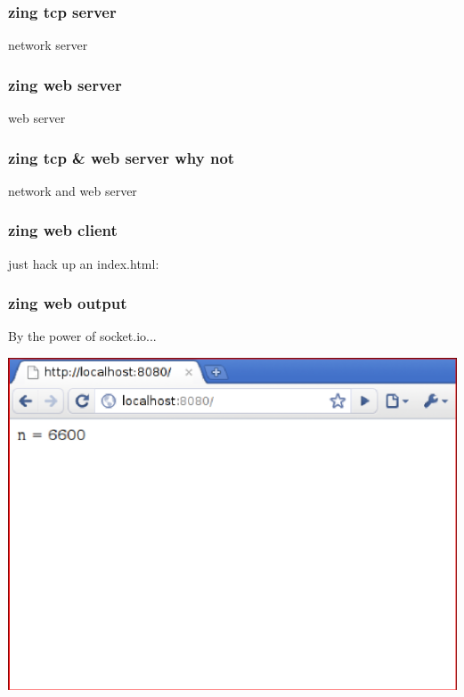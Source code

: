 \documentclass{beamer}
\begin{document}
\begin{frame}
    \frametitle{zing tcp server}
    
    \huge
    network server
    \newline
    
    \normalsize
    \fbox{}
\end{frame}

\begin{frame}
    \frametitle{zing web server}
    
    \huge
    web server
    \newline
    
    \normalsize
    \fbox{}
\end{frame}

\begin{frame}
    \frametitle{zing tcp \& web server why not}
    
    \huge
    network and web server
    \newline
    
    \normalsize
    \fbox{}
\end{frame}

\begin{frame}
    \frametitle{zing web client}
    \huge
    just hack up an index.html:
    \newline
    
    \scriptsize
    \fbox{}
\end{frame}

\begin{frame}
    \frametitle{zing web output}
    \huge
    By the power of socket.io...
    \newline
    
    \includegraphics[scale=0.6]{images/browser.png}
\end{frame}
\end{document}
